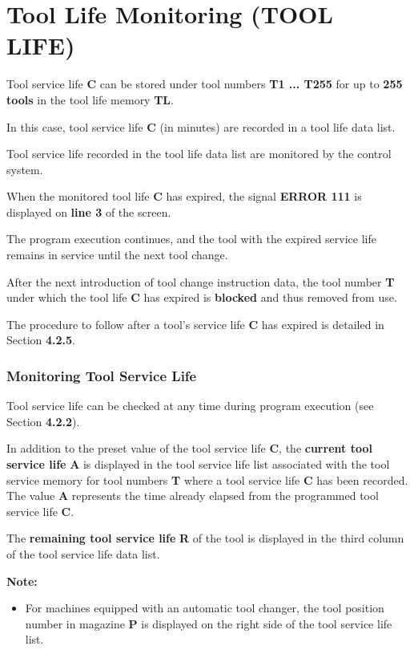 \newpage

\section{Tool Life Monitoring (TOOL LIFE)}

Tool service life \textbf{C} can be stored under tool numbers \textbf{T1 ... T255} for up to \textbf{255 tools} in the tool life memory \textbf{TL}.

In this case, tool service life \textbf{C} (in minutes) are recorded in a tool life data list.

Tool service life recorded in the tool life data list are monitored by the control system.

When the monitored tool life \textbf{C} has expired, the signal \textbf{ERROR 111} is displayed on \textbf{line 3} of the screen.

The program execution continues, and the tool with the expired service life remains in service until the next tool change.

After the next introduction of tool change instruction data, the tool number \textbf{T} under which the tool life \textbf{C} has expired is \textbf{blocked} and thus removed from use.

The procedure to follow after a tool’s service life \textbf{C} has expired is detailed in Section \textbf{4.2.5}.

\subsubsection*{Monitoring Tool Service Life}

Tool service life can be checked at any time during program execution (see Section \textbf{4.2.2}).

In addition to the preset value of the tool service life \textbf{C}, the \textbf{current tool service life} \textbf{A} is displayed in the tool service life list associated with the tool service memory for tool numbers \textbf{T} where a tool service life \textbf{C} has been recorded. The value \textbf{A} represents the time already elapsed from the programmed tool service life \textbf{C}.

The \textbf{remaining tool service life} \textbf{R} of the tool is displayed in the third column of the tool service life data list.

\textbf{Note:}
\begin{itemize}
    \item For machines equipped with an automatic tool changer, the tool position number in magazine \textbf{P} is displayed on the right side of the tool service life list.
\end{itemize}

